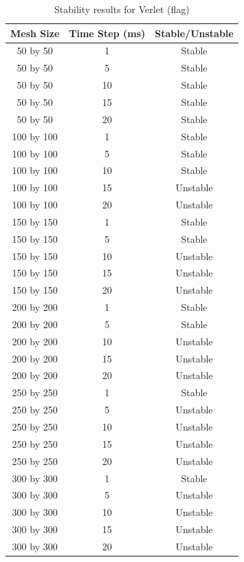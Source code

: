 \begin{table}[tp]
   \begin{minipage}{\textwidth}
      \begin{center}
         \begin{tabular}{|c|c|c|} \hline
           Mesh Size & Time Step (ms) & Stable/Unstable\\
           \hline
           50 by 50 & 1 & Stable\\ \hline
           50 by 50 & 5 & Stable\\ \hline
           50 by 50 & 10 & Stable\\ \hline
           50 by 50 & 15 & Stable\\ \hline
           50 by 50 & 20 & Stable\\ \hline
           100 by 100 & 1 & Stable\\ \hline
           100 by 100 & 5 & Stable\\ \hline
           100 by 100 & 10 & Stable\\ \hline
           100 by 100 & 15 & Unstable\\ \hline
           100 by 100 & 20 & Unstable\\ \hline           
           150 by 150 & 1 & Stable\\ \hline
           150 by 150 & 5 & Stable\\ \hline
           150 by 150 & 10 & Unstable\\ \hline
           150 by 150 & 15 & Unstable\\ \hline
           150 by 150 & 20 & Unstable\\ \hline           
           200 by 200 & 1 & Stable\\ \hline
           200 by 200 & 5 & Stable\\ \hline
           200 by 200 & 10 & Unstable\\ \hline
           200 by 200 & 15 & Unstable\\ \hline
           200 by 200 & 20 & Unstable\\ \hline           
           250 by 250 & 1 & Stable\\ \hline
           250 by 250 & 5 & Unstable\\ \hline
           250 by 250 & 10 & Unstable\\ \hline
           250 by 250 & 15 & Unstable\\ \hline
           250 by 250 & 20 & Unstable\\ \hline           
           300 by 300 & 1 & Stable\\ \hline
           300 by 300 & 5 & Unstable\\ \hline
           300 by 300 & 10 & Unstable\\ \hline
           300 by 300 & 15 & Unstable\\ \hline
           300 by 300 & 20 & Unstable\\ \hline
         \end{tabular}
      \end{center}
   \end{minipage}
   \caption{Stability results for Verlet (flag)}
   \label{tab:v stability flag}
\end{table}

